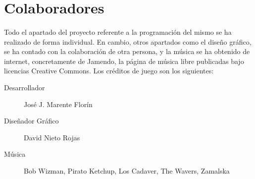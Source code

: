 \section{Colaboradores}

\paragraph{}
Todo el apartado del proyecto referente a la programación del mismo se ha realizado de forma individual. En cambio, otros apartados
como el diseño gráfico, se ha contado con la colaboración de otra persona, y la música se ha obtenido de internet, concretamente 
de Jamendo, la página de música libre publicadas bajo licencias Creative Commons. Los créditos de juego son los siguientes:

\begin{description}
    \item [Desarrollador] José J. Marente Florín
    \item [Diseñador Gráfico] David Nieto Rojas
    \item [Música] Bob Wizman, Pirato Ketchup, Los Cadaver, The Wavers, Zamalska 
\end{description}
